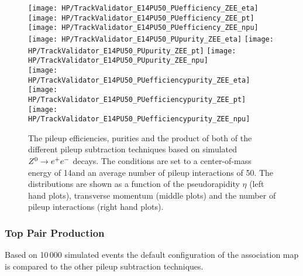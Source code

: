\begin{figure}[!h]
  \centering
  \texttt{[image: HP/TrackValidator\_E14PU50\_PUefficiency\_ZEE\_eta]}
  \texttt{[image: HP/TrackValidator\_E14PU50\_PUefficiency\_ZEE\_pt]}
  \texttt{[image: HP/TrackValidator\_E14PU50\_PUefficiency\_ZEE\_npu]}
   \\
  \texttt{[image: HP/TrackValidator\_E14PU50\_PUpurity\_ZEE\_eta]}
  \texttt{[image: HP/TrackValidator\_E14PU50\_PUpurity\_ZEE\_pt]}
  \texttt{[image: HP/TrackValidator\_E14PU50\_PUpurity\_ZEE\_npu]}
   \\
  \texttt{[image: HP/TrackValidator\_E14PU50\_PUefficiencypurity\_ZEE\_eta]}
  \texttt{[image: HP/TrackValidator\_E14PU50\_PUefficiencypurity\_ZEE\_pt]}
  \texttt{[image: HP/TrackValidator\_E14PU50\_PUefficiencypurity\_ZEE\_npu]}
  \caption[Pileup efficiencies, purities and their product of the different pileup subtraction techniques based $\Zz\rightarrow\EE$ decays with 14\TeV and $\left<PU\right>=50$]{The pileup efficiencies, purities and the product of both of the different pileup subtraction techniques based on simulated $\Zz\rightarrow\EE$ decays. The conditions are set to a center-of-mass energy of 14\TeV and an average number of pileup interactions of 50. The distributions are shown as a function of the pseudorapidity $\eta$ (left hand plots), transverse momentum (middle plots) and the number of pileup interactions (right hand plots).}
\end{figure}
\clearpage

\subsubsection{Top Pair Production}

Based on 10\,000 simulated \ttbar events the default configuration of the association map is compared to the other pileup subtraction techniques.

